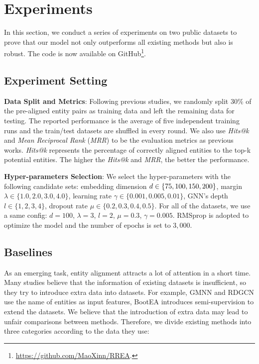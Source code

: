 \documentclass[sigconf,camera-ready]{acmart}
\begin{document}
\section{Experiments}
\label{exp}
In this section, we conduct a series of experiments on two public datasets to prove that our model not only outperforms all existing methods but also is robust.
The code is now available on GitHub\footnote{\url{https://github.com/MaoXinn/RREA}.}.

\subsection{Experiment Setting}
\textbf{Data Split and Metrics}:
Following previous studies, we randomly split $30\%$ of the pre-aligned entity pairs as training data and left the remaining data for testing.
The reported performance is the average of five independent training runs and the train/test datasets are shuffled in every round.
We also use \emph{Hits@k} and \emph{Mean Reciprocal Rank} (\emph{MRR}) to be the evaluation metrics as previous works.
\emph{Hits@k} represents the percentage of correctly aligned entities to the top-k potential entities.
The higher the \emph{Hits@k} and \emph{MRR}, the better the performance.

\noindent
\textbf{Hyper-parameters Selection}:
We select the hyper-parameters with the following candidate sets:
embedding dimension $d \in \{75, \\100, 150, 200\}$, margin $\lambda \in \{1.0, 2.0, 3.0, 4.0\}$, learning rate $\gamma \in \{0.001, 0.005, 0.01\}$,
GNN's depth $l \in \{1, 2, 3, 4\}$, dropout rate $\mu \in \{0.2, 0.3, 0.4, 0.5\}$.
For all of the datasets, we use a same config:
$d = 100$,  $\lambda=3$, $l = 2$, $\mu = 0.3$, $\gamma = 0.005$.
RMSprop is adopted to optimize the model and the number of epochs is set to $3,000$.

\subsection{Baselines}
As an emerging task, entity alignment attracts a lot of attention in a short time.
Many studies believe that the information of existing datasets is insufficient, so they try to introduce extra data into datasets.
For example, GMNN \cite{DBLP:conf/acl/XuWYFSWY19} and RDGCN \cite{DBLP:conf/ijcai/WuLF0Y019} use the name of entities as input features, BootEA \cite{DBLP:conf/ijcai/SunHZQ18} introduces semi-supervision to extend the datasets.
We believe that the introduction of extra data may lead to unfair comparisons between methods.
Therefore, we divide existing methods into three categories according to the data they use:
\end{document}

